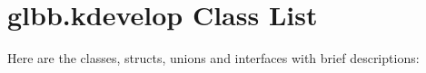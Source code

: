 \section{glbb.kdevelop Class List}
Here are the classes, structs, unions and interfaces with brief descriptions:\begin{CompactList}
\item{}
\end{CompactList}
